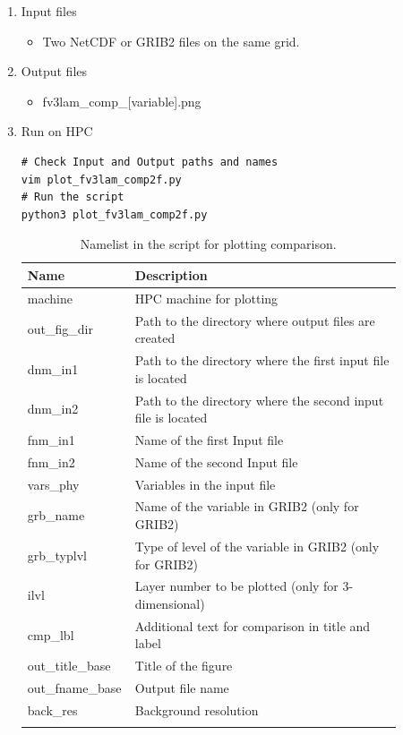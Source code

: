 \documentclass[11pt,fleqn]{report}              %
\begin{document}
\begin{enumerate}
\item Input files
\begin{itemize}
\item Two NetCDF or GRIB2 files on the same grid.
\end{itemize}
\item Output files
\begin{itemize}
\item fv3lam\_comp\_[variable].png
\end{itemize}
\item Run on HPC

\lstset{language=bash}   
\begin{lstlisting}[frame=trBL]
# Check Input and Output paths and names
vim plot_fv3lam_comp2f.py
# Run the script
python3 plot_fv3lam_comp2f.py
\end{lstlisting}


{
\fontsize{10}{12}\selectfont
\begin{longtable}{p{0.17\linewidth} | p{0.7\linewidth} }
\hline
\hline
Name & Description \\
\hline
 machine & HPC machine for plotting \\
 out\_fig\_dir & Path to the directory where output files are created \\
 dnm\_in1 & Path to the directory where the first input file is located   \\
 dnm\_in2 & Path to the directory where the second input file is located   \\
 fnm\_in1 & Name of the first Input file  \\
 fnm\_in2 & Name of the second Input file  \\
 vars\_phy & Variables in the input file \\
 grb\_name &  Name of the variable in GRIB2 (only for GRIB2) \\
 grb\_typlvl & Type of level of the variable in GRIB2 (only for GRIB2) \\
 ilvl & Layer number to be plotted (only for 3-dimensional) \\
 cmp\_lbl & Additional text for comparison in title and label \\
 out\_title\_base & Title of the figure \\
 out\_fname\_base & Output file name \\
 back\_res & Background resolution \\
\hline
\caption{Namelist in the script for plotting comparison.}
\label{table:fv3_var_plot_comp}
\end{longtable}
}


\end{enumerate}
\end{document}
